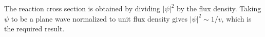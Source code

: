 The reaction cross section is obtained by dividing $|\psi|^2$ by the flux density. Taking $\psi$ to be a plane wave normalized to unit flux density gives $|\psi|^2\sim1/v$, which is the required result.
